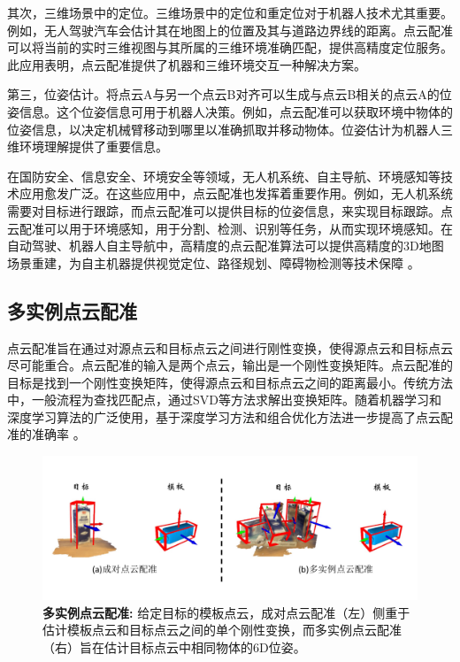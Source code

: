 其次，三维场景中的定位。三维场景中的定位和重定位对于机器人技术尤其重要。例如，无人驾驶汽车会估计其在地图上的位置及其与道路边界线的距离。点云配准可以将当前的实时三维视图与其所属的三维环境准确匹配，提供高精度定位服务。此应用表明，点云配准提供了机器和三维环境交互一种解决方案。

第三，位姿估计。将点云A与另一个点云B对齐可以生成与点云B相关的点云A的位姿信息。这个位姿信息可用于机器人决策。例如，点云配准可以获取环境中物体的位姿信息，以决定机械臂移动到哪里以准确抓取并移动物体。位姿估计为机器人三维环境理解提供了重要信息。

在国防安全、信息安全、环境安全等领域，无人机系统、自主导航、环境感知等技术应用愈发广泛。在这些应用中，点云配准也发挥着重要作用。例如，无人机系统需要对目标进行跟踪，而点云配准可以提供目标的位姿信息，来实现目标跟踪。点云配准可以用于环境感知，用于分割、检测、识别等任务，从而实现环境感知。在自动驾驶、机器人自主导航中，高精度的点云配准算法可以提供高精度的3D地图场景重建，为自主机器提供视觉定位、路径规划、障碍物检测等技术保障\cite{zidongjiashilujingguihua} 。


\subsection{多实例点云配准}
点云配准旨在通过对源点云和目标点云之间进行刚性变换，使得源点云和目标点云尽可能重合。点云配准的输入是两个点云，输出是一个刚性变换矩阵。点云配准的目标是找到一个刚性变换矩阵，使得源点云和目标点云之间的距离最小。传统方法中，一般流程为查找匹配点，通过SVD\cite{SVD}等方法求解出变换矩阵。随着机器学习和深度学习算法的广泛使用，基于深度学习方法和组合优化方法进一步提高了点云配准的准确率\cite{deng2018ppf,deng2018ppfnet,qin2022geometric} 。

\begin{figure}[ht]
    \vspace{-4mm}
    \includegraphics[width=\textwidth]{images/teaser.pdf}
    \caption{\textbf{多实例点云配准: } 给定目标的模板点云，成对点云配准（左）侧重于估计模板点云和目标点云之间的单个刚性变换，而多实例点云配准（右）旨在估计目标点云中相同物体的6D位姿。
    }
    \label{fig:teaser}
    \vspace{-10mm}
\end{figure}

